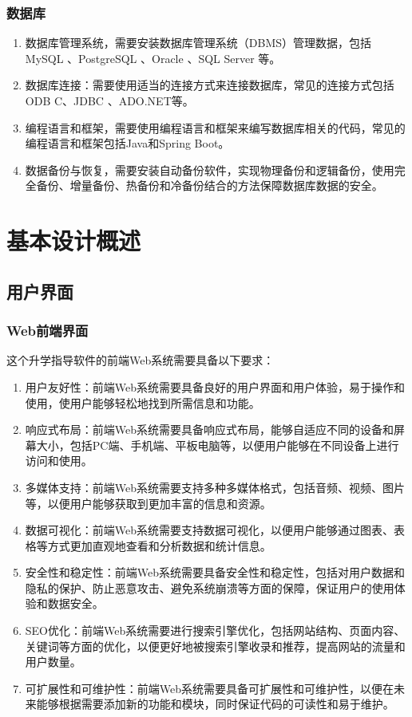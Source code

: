 \documentclass[UTF8]{ctexart}
\newcommand{\m}[1]{\textcolor{modify}{#1}}
\begin{document}
    \subsubsection{数据库}
    \begin{enumerate}
        \item 数据库管理系统，需要安装数据库管理系统（DBMS）管理数据，包括 MySQL 、PostgreSQL 、Oracle 、SQL Server 等。
        \item 数据库连接：需要使用适当的连接方式来连接数据库，常见的连接方式包括 ODB C、JDBC 、ADO.NET等。
        \item 编程语言和框架，需要使用编程语言和框架来编写数据库相关的代码，常见的编程语言和框架包括Java和Spring Boot。
        \item 数据备份与恢复，需要安装自动备份软件，实现物理备份和逻辑备份，使用完全备份、增量备份、热备份和冷备份结合的方法保障数据库数据的安全。
    \end{enumerate}

    \section{基本设计概述}
    \subsection{用户界面}
    \subsubsection{Web前端界面}
    \par
    这个升学指导软件的前端Web系统需要具备以下要求：
    \begin{enumerate}
        \item 用户友好性：前端Web系统需要具备良好的用户界面和用户体验，易于操作和使用，使用户能够轻松地找到所需信息和功能。
        \item 响应式布局：前端Web系统需要具备响应式布局，能够自适应不同的设备和屏幕大小，包括PC端、手机端、平板电脑等，以便用户能够在不同设备上进行访问和使用。
        \item \m{多媒体支持：前端Web系统需要支持多种多媒体格式，包括音频、视频、图片等，以便用户能够获取到更加丰富的信息和资源}。
        \item 数据可视化：前端Web系统需要支持数据可视化，以便用户能够通过图表、表格等方式更加直观地查看和分析数据和统计信息。
        \item \m{安全性和稳定性：前端Web系统需要具备安全性和稳定性，包括对用户数据和隐私的保护、防止恶意攻击、避免系统崩溃等方面的保障，保证用户的使用体验和数据安全}。
        \item \m{SEO优化：前端Web系统需要进行搜索引擎优化，包括网站结构、页面内容、关键词等方面的优化，以便更好地被搜索引擎收录和推荐，提高网站的流量和用户数量}。
        \item \m{可扩展性和可维护性：前端Web系统需要具备可扩展性和可维护性，以便在未来能够根据需要添加新的功能和模块，同时保证代码的可读性和易于维护}。
    \end{enumerate}
\end{document}
